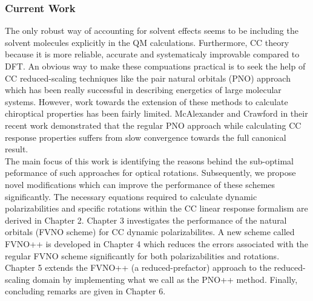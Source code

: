 \subsubsection{Current Work}
The only robust way of accounting for solvent effects seems to be including the solvent molecules explicitly 
in the QM calculations. Furthermore, CC theory because it is more reliable, accurate and systematicaly 
improvable compared to DFT.
An obvious way to make these compuations practical is to seek the help of CC reduced-scaling 
techniques like the pair natural orbitals (PNO) approach\cite{NeeseCCSD09,Neese09} which has been really successful in describing energetics of 
large molecular systems. However, work towards the extension of these methods to calculate chiroptical properties has been 
fairly limited\cite{Friedrich15,Gauss00,Korona04,McAlexander12,Russ04,Russ08}. McAlexander and Crawford in their recent 
work\cite{McAlexander15:LRCC} demonstrated that the regular PNO approach while calculating CC response properties 
suffers from slow convergence towards the full canonical result. \\
The main focus of this work is identifying the 
reasons behind the sub-optimal peformance of such approaches for optical rotations. Subsequently, we propose novel modifications
which can improve the performance of these schemes significantly. The necessary equations required to calculate dynamic polarizabilities 
and specific rotations within the CC linear response formalism are derived in Chapter 2. 
Chapter 3 investigates the performance of the natural orbitals (FVNO scheme) for CC dynamic polarizabilites.
A new scheme called FVNO++ is developed in Chapter 4 which reduces the errors associated with the regular FVNO scheme
significantly for both polarizabilities and rotations. Chapter 5 extends the FVNO++ (a reduced-prefactor) approach to the reduced-scaling 
domain by implementing what we call as the PNO++ method. Finally, concluding remarks are given in Chapter 6.
